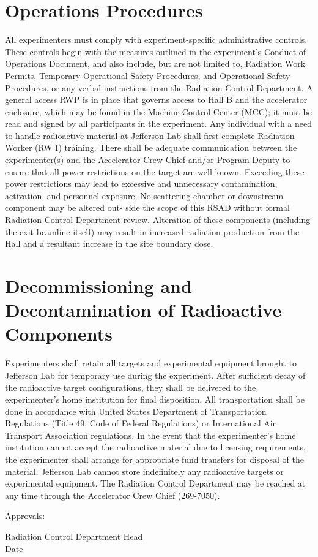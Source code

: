 \documentclass[12pt]{article}
\begin{document}
\section{Operations Procedures}
All experimenters must comply with experiment-specific administrative
controls. These controls begin with the measures outlined in the experiment's
Conduct of Operations Document, and also include, but are not limited to,
Radiation Work Permits, Temporary Operational Safety Procedures, and
Operational Safety Procedures, or any verbal instructions from the Radiation
Control Department. A general access RWP is in place that governs access
to Hall B and the accelerator enclosure, which may be found in the Machine
Control Center (MCC); it must be read and signed by all participants in the
experiment. Any individual with a need to handle radioactive material at
Jefferson Lab shall first complete Radiation Worker (RW I) training.
There shall be adequate communication between the experimenter(s) and
the Accelerator Crew Chief and/or Program Deputy to ensure that all power
restrictions on the target are well known. Exceeding these power restrictions 
may lead to excessive and unnecessary contamination, activation, and
personnel exposure.
No scattering chamber or downstream component may be altered out-
side the scope of this RSAD without formal Radiation Control Department
review. Alteration of these components (including the exit beamline itself)
may result in increased radiation production from the Hall and a resultant
increase in the site boundary dose.

\section{Decommissioning and Decontamination of Radioactive Components}
Experimenters shall retain all targets and experimental equipment brought
to Jefferson Lab for temporary use during the experiment. After sufficient 
decay of the radioactive target configurations, they shall be delivered to the 
experimenter's home institution for final disposition. All transportation shall 
be done in accordance with United States Department of Transportation 
Regulations (Title 49, Code of Federal Regulations) or International Air 
Transport Association regulations. In the event that the experimenter's home 
institution cannot accept the radioactive material due to licensing 
requirements, the experimenter shall arrange for appropriate fund transfers for 
disposal of the material. Jefferson Lab cannot store indefinitely any 
radioactive targets or experimental equipment.
The Radiation Control Department may be reached at any time
through the Accelerator Crew Chief (269-7050).


Approvals:

Radiation Control Department Head    ~~~~~~~~~~~~~~~~~~~~~~~~~~~~~~~~~~~~ Date
\end{document}
